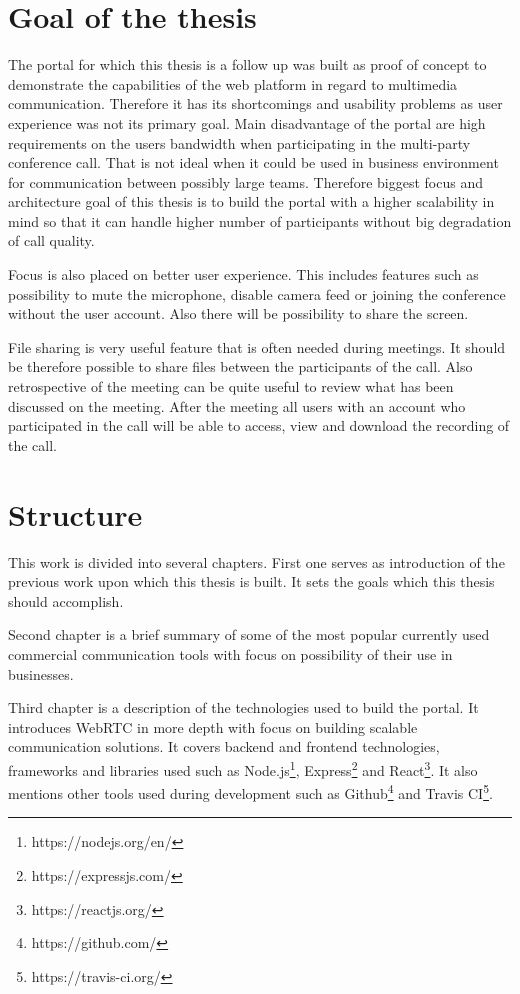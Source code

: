 \documentclass[
  digital, %
  table,   %
  lof,     %
  nolot,     %
]{fithesis3}
\begin{document}
\section{Goal of the thesis}
The portal for which this thesis is a follow up was built as proof of concept to demonstrate the capabilities of the web platform in regard to multimedia communication. Therefore it has its shortcomings and usability problems as user experience was not its primary goal. Main disadvantage of the portal are high requirements on the users bandwidth when participating in the multi-party conference call. That is not ideal when it could be used in business environment for communication between possibly large teams. Therefore biggest focus and architecture goal of this thesis is to build the portal with a higher scalability in mind so that it can handle higher number of participants without big degradation of call quality.

Focus is also placed on better user experience. This includes features such as possibility to mute the microphone, disable camera feed or joining  the conference without the user account. Also there will be possibility to share the screen.
 
File sharing is very useful feature that is often needed during meetings. It should be therefore possible to share files between the participants of the call. Also retrospective of the meeting can be quite useful to review what has been discussed on the meeting. After the meeting all users with an account who participated in the call will be able to access, view and download the recording of the call.

\section{Structure}
This work is divided into several chapters. First one serves as introduction of the previous work upon which this thesis is built. It sets the goals which this thesis should accomplish.

Second chapter is a brief summary of some of the most popular currently used commercial communication tools with focus on possibility of their use in businesses.

Third chapter is a description of the technologies used to build the portal. It introduces WebRTC in more depth with focus on building scalable communication solutions. It covers backend and frontend technologies, frameworks and libraries used such as Node.js\footnote{https://nodejs.org/en/}, Express\footnote{https://expressjs.com/} and React\footnote{https://reactjs.org/}. It also mentions other tools used during development such as Github\footnote{https://github.com/} and Travis CI\footnote{https://travis-ci.org/}.
\end{document}
